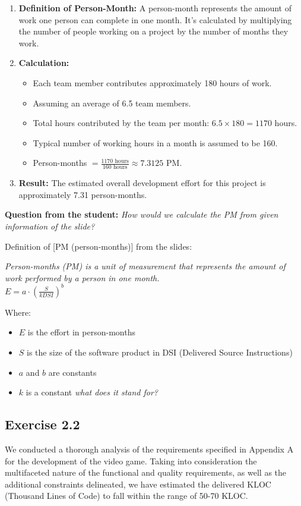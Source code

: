 \documentclass[a4paper]{scrartcl}
\begin{document}
\begin{enumerate}
    \item \textbf{Definition of Person-Month:} A person-month represents the amount of work one person can complete in one month. It's calculated by multiplying the number of people working on a project by the number of months they work.
    
    \item \textbf{Calculation:}
    \begin{itemize}
        \item Each team member contributes approximately 180 hours of work.
        \item Assuming an average of 6.5 team members.
        \item Total hours contributed by the team per month: $6.5 \times 180 = 1170$ hours.
        \item Typical number of working hours in a month is assumed to be 160.
        \item Person-months $= \frac{1170 \text{ hours}}{160 \text{ hours}} \approx 7.3125 \text{ PM}$.
    \end{itemize}
    
    \item \textbf{Result:} The estimated overall development effort for this project is approximately 7.31 person-months.
\end{enumerate}
\textbf{Question from the student:} \textit{How would we calculate the PM from given information of the slide?}

Definition of [PM (person-months)] from the slides:
\begin{center}
  \textit{Person-months (PM) is a unit of measurement that
   represents the amount of work performed by a person in one month.} \\
  $E = a \cdot (\frac{S}{kDSI})^b$
\end{center}

Where:
\begin{itemize}
  \item $E$ is the effort in person-months
  \item $S$ is the size of the software product in DSI (Delivered Source Instructions)
  \item $a$ and $b$ are constants
  \item $k$ is a constant \textit{what does it stand for?}
\end{itemize}

\subsection*{Exercise 2.2}
We conducted a thorough analysis of the requirements specified in Appendix A for the development of the video game. Taking into consideration the multifaceted nature of the functional and quality requirements, as well as the additional constraints delineated, we have estimated the delivered KLOC (Thousand Lines of Code) to fall within the range of 50-70 KLOC.
\end{document}
